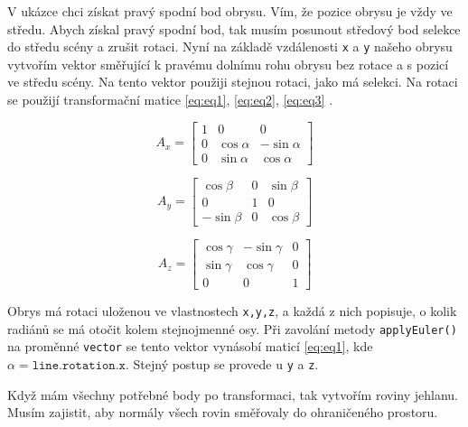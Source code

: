\documentclass[czech,bachelor,dept420,male,cpdeclaration]{diploma}
\begin{document}
 


V ukázce chci získat pravý spodní bod obrysu. Vím, že pozice obrysu je vždy ve středu. Abych získal pravý spodní bod, tak musím posunout středový bod selekce do středu scény a zrušit rotaci. Nyní na základě vzdálenosti \texttt{x} a \texttt{y} našeho obrysu vytvořím vektor směřující k pravému dolnímu rohu obrysu bez rotace a s pozicí ve středu scény. Na tento vektor použiji stejnou rotaci, jako má selekci. Na rotaci se použijí transformační matice \eqref{eq:eq1}, \eqref{eq:eq2}, \eqref{eq:eq3} \cite{sojka_2003}.

\begin{equation}
		A_x =
		\begin{bmatrix}%
    1 & 0 & 0 \\
		0 & \cos \alpha & -\sin \alpha \\ 
		0 & \sin \alpha & \cos \alpha
    \end{bmatrix}
\label{eq:eq1}
\end{equation}

\begin{equation}
		A_y =
		\begin{bmatrix}%
    \cos \beta & 0 & \sin \beta \\
		0 & 1 & 0 \\ 
		-\sin \beta & 0 & \cos \beta
    \end{bmatrix}
\label{eq:eq2}
\end{equation}

\begin{equation}
		A_z =
		\begin{bmatrix}%
    \cos \gamma & -\sin \gamma & 0 \\
		\sin \gamma & \cos \gamma & 0 \\ 
		0 & 0 & 1
    \end{bmatrix}
\label{eq:eq3}
\end{equation}

Obrys má rotaci uloženou ve vlastnostech \texttt{x,y,z}, a každá z nich popisuje, o kolik radiánů se má otočit kolem stejnojmenné osy. Při zavolání metody \texttt{applyEuler()} na proměnné \texttt{vector} se tento vektor vynásobí maticí \eqref{eq:eq1}, kde $ \alpha = \texttt{line.rotation.x} $. Stejný postup se provede u \texttt{y} a \texttt{z}.  

Když mám všechny potřebné body po transformaci, tak vytvořím roviny jehlanu. Musím zajistit, aby normály všech rovin směřovaly do ohraničeného prostoru. 
\end{document}
